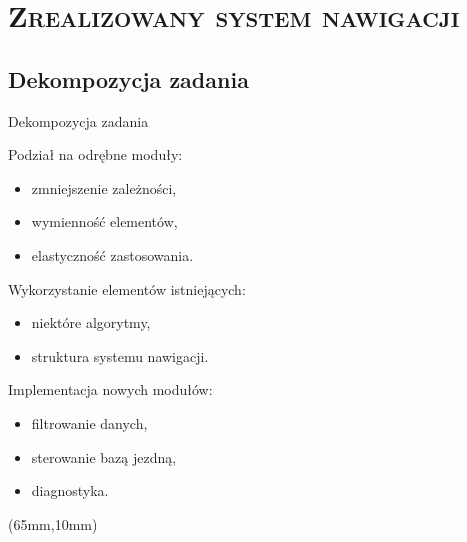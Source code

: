 \documentclass[xcolor=x11names,compress]{beamer}
\renewcommand{\(}{\begin{columns}}
\renewcommand{\)}{\end{columns}}
\newcommand{\<}[1]{\begin{column}{#1}}
\renewcommand{\>}{\end{column}}
\begin{document}
\section{\scshape Zrealizowany system nawigacji}
\subsection{Dekompozycja zadania}
\begin{frame}{Dekompozycja zadania}

\alert{Podział na odrębne moduły:}
\begin{itemize}
\item zmniejszenie zależności,
\item wymienność elementów,
\item elastyczność zastosowania.
\end{itemize}

\vspace{.2cm}

\alert{Wykorzystanie elementów istniejących:}
\begin{itemize}
\item niektóre algorytmy,
\item struktura systemu nawigacji.
\end{itemize}

\vspace{.2cm}

\alert{Implementacja nowych modułów:}
\begin{itemize}
\item filtrowanie danych,
\item sterowanie bazą jezdną,
\item diagnostyka.
\end{itemize}

\begin{textblock*}{70mm}(65mm,10mm)%
    \begin{minipage}[l]{70mm}%


\end{minipage}
\end{textblock*}
\end{frame}
\end{document}
